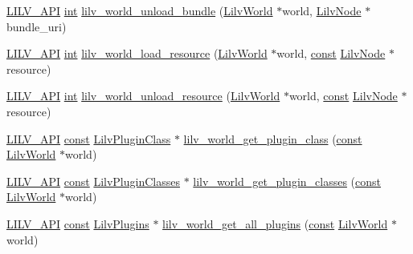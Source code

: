 \begin{DoxyCompactItemize}
\item 
\hyperlink{lilv_8h_aa5182eee7ddff96862d0171967ee6f77}{L\+I\+L\+V\+\_\+\+A\+PI} \hyperlink{xmltok_8h_a5a0d4a5641ce434f1d23533f2b2e6653}{int} \hyperlink{group__lilv_ga11cbc3ff8a81faaec58e17cdee88c970}{lilv\+\_\+world\+\_\+unload\+\_\+bundle} (\hyperlink{lilv_8h_a91c1745aa6ffca2b6b87c56df6c5ab86}{Lilv\+World} $\ast$world, \hyperlink{lilv_8h_ae183dca3dca5368d34dbd863a405437b}{Lilv\+Node} $\ast$bundle\+\_\+uri)
\item 
\hyperlink{lilv_8h_aa5182eee7ddff96862d0171967ee6f77}{L\+I\+L\+V\+\_\+\+A\+PI} \hyperlink{xmltok_8h_a5a0d4a5641ce434f1d23533f2b2e6653}{int} \hyperlink{group__lilv_ga2cc5fde69222a790f8aae81547156220}{lilv\+\_\+world\+\_\+load\+\_\+resource} (\hyperlink{lilv_8h_a91c1745aa6ffca2b6b87c56df6c5ab86}{Lilv\+World} $\ast$world, \hyperlink{getopt1_8c_a2c212835823e3c54a8ab6d95c652660e}{const} \hyperlink{lilv_8h_ae183dca3dca5368d34dbd863a405437b}{Lilv\+Node} $\ast$resource)
\item 
\hyperlink{lilv_8h_aa5182eee7ddff96862d0171967ee6f77}{L\+I\+L\+V\+\_\+\+A\+PI} \hyperlink{xmltok_8h_a5a0d4a5641ce434f1d23533f2b2e6653}{int} \hyperlink{group__lilv_gaf9dbb29749298fc128c150ec068e43ba}{lilv\+\_\+world\+\_\+unload\+\_\+resource} (\hyperlink{lilv_8h_a91c1745aa6ffca2b6b87c56df6c5ab86}{Lilv\+World} $\ast$world, \hyperlink{getopt1_8c_a2c212835823e3c54a8ab6d95c652660e}{const} \hyperlink{lilv_8h_ae183dca3dca5368d34dbd863a405437b}{Lilv\+Node} $\ast$resource)
\item 
\hyperlink{lilv_8h_aa5182eee7ddff96862d0171967ee6f77}{L\+I\+L\+V\+\_\+\+A\+PI} \hyperlink{getopt1_8c_a2c212835823e3c54a8ab6d95c652660e}{const} \hyperlink{lilv_8h_a94da06d43a4f980af280b9d8bf4ae1f0}{Lilv\+Plugin\+Class} $\ast$ \hyperlink{group__lilv_ga53462897e33933d06ffd1db9ef427039}{lilv\+\_\+world\+\_\+get\+\_\+plugin\+\_\+class} (\hyperlink{getopt1_8c_a2c212835823e3c54a8ab6d95c652660e}{const} \hyperlink{lilv_8h_a91c1745aa6ffca2b6b87c56df6c5ab86}{Lilv\+World} $\ast$world)
\item 
\hyperlink{lilv_8h_aa5182eee7ddff96862d0171967ee6f77}{L\+I\+L\+V\+\_\+\+A\+PI} \hyperlink{getopt1_8c_a2c212835823e3c54a8ab6d95c652660e}{const} \hyperlink{lilv_8h_a1ef5389c0a24cb8e0adcf971d2d12f0e}{Lilv\+Plugin\+Classes} $\ast$ \hyperlink{group__lilv_ga15ea5899a81d056542c1583210387580}{lilv\+\_\+world\+\_\+get\+\_\+plugin\+\_\+classes} (\hyperlink{getopt1_8c_a2c212835823e3c54a8ab6d95c652660e}{const} \hyperlink{lilv_8h_a91c1745aa6ffca2b6b87c56df6c5ab86}{Lilv\+World} $\ast$world)
\item 
\hyperlink{lilv_8h_aa5182eee7ddff96862d0171967ee6f77}{L\+I\+L\+V\+\_\+\+A\+PI} \hyperlink{getopt1_8c_a2c212835823e3c54a8ab6d95c652660e}{const} \hyperlink{lilv_8h_ae2c6def8207facadef355b47b8802911}{Lilv\+Plugins} $\ast$ \hyperlink{group__lilv_ga438aa2990d919506dd19136dd817dc32}{lilv\+\_\+world\+\_\+get\+\_\+all\+\_\+plugins} (\hyperlink{getopt1_8c_a2c212835823e3c54a8ab6d95c652660e}{const} \hyperlink{lilv_8h_a91c1745aa6ffca2b6b87c56df6c5ab86}{Lilv\+World} $\ast$world)

\end{DoxyCompactItemize}
